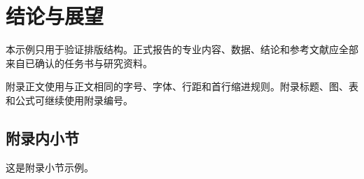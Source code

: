 \documentclass{techreport}
\begin{document}
\begin{symbols}
\end{symbols}

\section{结论与展望}

本示例只用于验证排版结构。正式报告的专业内容、数据、结论和参考文献应全部来自已确认的任务书与研究资料。

\reportappendices
{}

附录正文使用与正文相同的字号、字体、行距和首行缩进规则。附录标题、图、表和公式可继续使用附录编号。

\subsection{附录内小节}

这是附录小节示例。

\begin{reportbibliography}
\end{reportbibliography}
\end{document}
